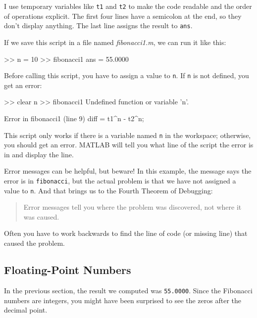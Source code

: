 I use temporary variables like \lstinline{t1} and \lstinline{t2} to make the code readable and the order of operations explicit.  The first four lines have a semicolon at the end, so they don't display anything.  The last line assigns the result to \lstinline{ans}.


If we save this script in a file named \emph{fibonacci1.m}, we can run it like this:

\begin{code}
>> n = 10
>> fibonacci1
ans = 55.0000
\end{code}

Before calling this script, you have to assign a value to \lstinline{n}.
If \lstinline{n} is not defined, you get an error:

\begin{code}
>> clear n
>> fibonacci1
Undefined function or variable 'n'.

Error in fibonacci1 (line 9)
diff = t1^n - t2^n;
\end{code}

This script only works if there is a variable named \lstinline{n} in the workspace; otherwise, you should get an error.
MATLAB will tell you what line of the script the error is in and display the line.



Error messages can be helpful, but beware!
In this example, the message says the error is in \lstinline{fibonacci}, but the actual problem is that we have not assigned a value to \lstinline{n}.
And that brings us to the Fourth Theorem of Debugging:

\begin{quote}
Error messages tell you where the problem was discovered,
not where it was caused.
\end{quote}

Often you have to work backwards to find the line of code (or missing line) that caused the problem.

\subsection{Floating-Point Numbers}

In the previous section, the result we computed was \lstinline{55.0000}.  Since the Fibonacci numbers are integers, you might have been surprised to see the zeros after the decimal point.

